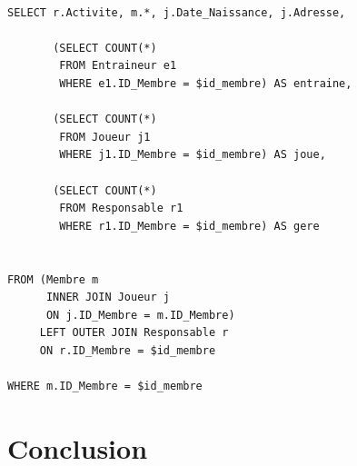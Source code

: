 \documentclass[a4paper»,8pt,french,fleqn]{report}
\begin{document}
\begin{lstlisting}

SELECT r.Activite, m.*, j.Date_Naissance, j.Adresse,

       (SELECT COUNT(*) 
        FROM Entraineur e1
        WHERE e1.ID_Membre = $id_membre) AS entraine,

       (SELECT COUNT(*)
        FROM Joueur j1
        WHERE j1.ID_Membre = $id_membre) AS joue,

       (SELECT COUNT(*)
        FROM Responsable r1
        WHERE r1.ID_Membre = $id_membre) AS gere


FROM (Membre m 
      INNER JOIN Joueur j
      ON j.ID_Membre = m.ID_Membre)
     LEFT OUTER JOIN Responsable r
     ON r.ID_Membre = $id_membre
     
WHERE m.ID_Membre = $id_membre

\end{lstlisting}  

\chapter*{Conclusion}
\end{document}
